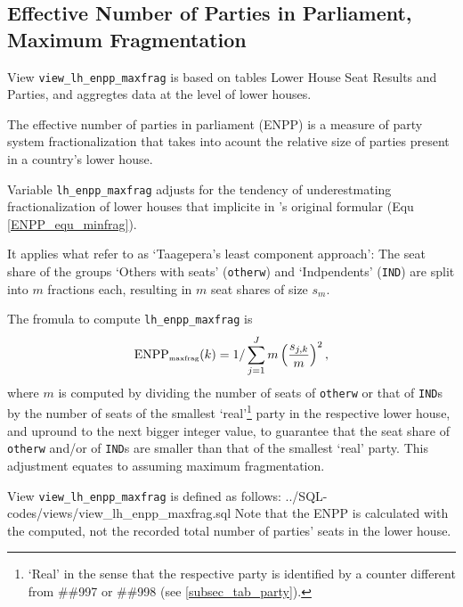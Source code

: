 \subsection{Effective Number of Parties in Parliament, Maximum Fragmentation}\label{subsec_view_lh_enpp_maxfrag}

View \texttt{view\_lh\_enpp\_maxfrag} is based on tables Lower House Seat Results and Parties, and aggregtes data at the level of lower houses.

The effective number of parties in parliament (ENPP) is a measure of party system fractionalization that takes into acount the relative size of parties present in a country's lower house. 

Variable \texttt{lh\_enpp\_maxfrag} adjusts for the tendency of underestmating fractionalization of lower houses that implicite in \citeauthor{Laakso&Taagepera1979}'s original formular (Equ \ref{ENPP_equ_minfrag}). 

It applies what \citet[pp.\,600-602]{Gallagher&Mitchell2005} refer to as `Taagepera's least component approach': The seat share of the groups `Others with seats' (\texttt{otherw}) and `Indpendents' (\texttt{IND}) are split into $m$ fractions each, resulting in $m$ seat shares of size $s_{m}$. 

The fromula to compute \texttt{lh\_enpp\_maxfrag} is
\begin{equation}\label{ENPP_equ_maxfrag}
\mbox{ENPP}_{\mbox{\tiny maxfrag}}(k) = 1/\sum\limits_{j=1}^{J}m\left(\frac{s_{j,k}}{m}\right)^{2},
\end{equation} 
where $m$ is computed by dividing the number of seats of \texttt{otherw} or that of \texttt{IND}s by the number of seats of the smallest `real'\footnote{`Real' in the sense that the respective party is identified by a counter different from \#\#997 or \#\#998 (see \ref{subsec_tab_party}).} party in the respective lower house, and upround to the next bigger integer value, to guarantee that the seat share of  \texttt{otherw} and/or of \texttt{IND}s are smaller than that of the smallest `real' party. 
This adjustment equates to assuming maximum fragmentation.

View \texttt{view\_lh\_enpp\_maxfrag} is defined as follows:
%
{../SQL-codes/views/view_lh_enpp_maxfrag.sql}
Note that the ENPP is calculated with the computed, not the recorded total number of parties' seats in the lower house.

